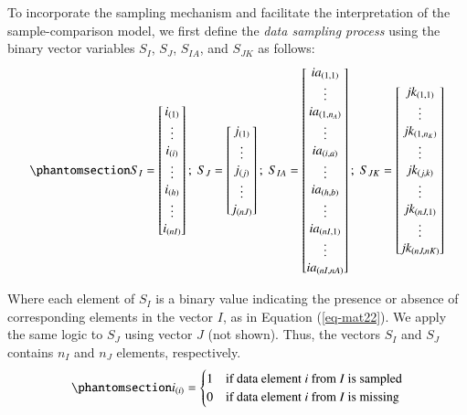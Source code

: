 \documentclass[
  authoryear,
  review,
  1p]{elsarticle}
\begin{document}
To incorporate the sampling mechanism and facilitate the interpretation
of the sample-comparison model, we first define the \emph{data sampling
process} using the binary vector variables \(S_{I}\), \(S_{J}\),
\(S_{IA}\), and \(S_{JK}\) as follows:
\begin{equation}\phantomsection\label{eq-mat21}{
S_{I} = \begin{bmatrix}
i_{(1)} \\
\vdots \\
i_{(i)} \\
\vdots \\
i_{(h)} \\
\vdots \\
i_{(nI)}
\end{bmatrix} ; \;
S_{J} = \begin{bmatrix}
j_{(1)} \\
\vdots \\
j_{(j)} \\
\vdots \\
j_{(nJ)}
\end{bmatrix} ; \;
S_{IA} = \begin{bmatrix}
ia_{(1,1)} \\
\vdots \\
ia_{(1,n_{A})} \\
\vdots \\
ia_{(i,a)} \\
\vdots \\
ia_{(h,b)} \\
\vdots \\
ia_{(nI,1)} \\
\vdots \\
ia_{(nI,nA)}
\end{bmatrix} ; \;
S_{JK} = \begin{bmatrix}
jk_{(1,1)} \\
\vdots \\
jk_{(1,n_{K})} \\
\vdots \\
jk_{(j,k)} \\
\vdots \\
jk_{(nJ,1)} \\
\vdots \\
jk_{(nJ,nK)}
\end{bmatrix}
}\end{equation}

Where each element of \(S_{I}\) is a binary value indicating the
presence or absence of corresponding elements in the vector \(I\), as in
Equation (\ref{eq-mat22}). We apply the same logic to \(S_{J}\) using
vector \(J\) (not shown). Thus, the vectors \(S_{I}\) and \(S_{J}\)
contains \(n_{I}\) and \(n_{J}\) elements, respectively.
\begin{equation}\phantomsection\label{eq-mat22}{
i_{(i)} = \begin{cases} 
1 & \text{if data element } i \text{ from } I \text{ is sampled} \\
0 & \text{if data element } i \text{ from } I \text{ is missing}
\end{cases}
}\end{equation}
\end{document}
